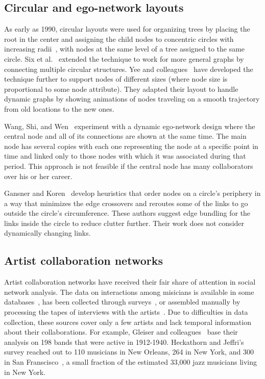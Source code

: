 \documentclass[12pt]{cmuthesis}
\begin{document}

  \subsection{Circular and ego-network layouts}

  As early as 1990, circular layouts were used for organizing trees by placing the
  root in the center and assigning the child nodes to concentric circles with
  increasing radii~\cite{North1997}, with nodes at the same level of a tree
  assigned to the same circle. Six et al.~\cite{Six1999}
  extended the technique to work for more general graphs by connecting multiple
  circular structures. Yee and colleagues~\cite{Yee2001} have developed the technique
  further to support nodes of different sizes (where node size is proportional
  to some node attribute). They adapted their layout to handle dynamic graphs by
  showing animations of nodes traveling on a smooth trajectory from old
  locations to the new ones.

  Wang, Shi, and Wen~\cite{Wang2011a} experiment with a dynamic ego-network design
  where the central node and all of its connections are shown at the same time.
  The main node has several copies with each one representing the node at a
  specific point in time and linked only to those nodes with which it was
  associated during that period. This approach is not feasible if the
  central node has many collaborators over his or her career.

  Gansner and Koren~\cite{Gansner2006} develop
  heuristics that order nodes on a circle's periphery in a way that minimizes the
  edge crossovers and reroutes some of the links to go outside the circle's
  circumference. These authors suggest edge bundling for the links inside the circle to
  reduce clutter further. Their work does not consider dynamically changing links.


  \subsection{Artist collaboration networks}

  Artist collaboration networks have received their fair share of attention in
  social network analysis. The data on interactions among misicians is available
  in some databases~\cite{Gleiser2003,Pattuelli2012}, has been collected through
  surveys~\cite{Heckathorn2001a}, or assembled manually by processing the tapes of
  interviews with the artists~\cite{Pattuelli2011}. Due to difficulties in data
  collection, these sources cover only a few artists and lack
  temporal information about their collaborations. For example, Gleiser and
  colleagues~\cite{Gleiser2003} base their analysis on 198 bands that were active
  in 1912-1940. Heckathorn and Jeffri's survey reached out to 110 musicians in
  New Orleans, 264 in New York, and 300 in San Franscisco~\cite{Heckathorn2001a},
  a small fraction of the estimated 33,000 jazz musicians living in New York.
\end{document}
